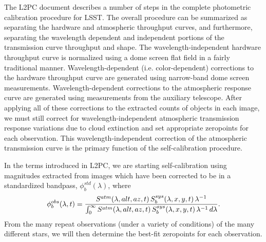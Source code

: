 \documentclass[12pt,preprint]{aastex}
\begin{document}
The L2PC document describes a number of steps in the complete
photometric calibration procedure for LSST. The overall procedure can
be summarized as separating the hardware and atmospheric throughput
curves, and furthermore, separating the wavelength dependent and
independent portions of the transmission curve throughput and
shape. The wavelength-independent hardware throughput curve is
normalized using a dome screen flat field in a fairly traditional
manner. Wavelength-dependent (i.e. color-dependent) corrections to the
hardware throughput curve are generated using narrow-band dome screen
measurements. Wavelength-dependent corrections to the atmospheric
response curve are generated using measurements from the auxiliary
telescope. After applying all of these corrections to the extracted
counts of objects in each image, we must still correct for
wavelength-independent atmospheric transmission response variations
due to cloud extinction and set appropriate zeropoints for each
observation. This wavelength-independent correction of the
atmospheric transmission curve is the primary function of the
self-calibration procedure.


In the terms introduced in L2PC, we are starting self-calibration
using magnitudes extracted from images which have been corrected to be
in a standardized bandpass, $\phi_b^{std}(\lambda)$, where
\begin{equation}
\label{eqn:PhiDef}
	   \phi_b^{obs}(\lambda,t) =  {
	     {S^{atm}(\lambda,alt,az,t)\, S_b^{sys}(\lambda,x,y,t) \,
	       \lambda^{-1}} \over
	     \int_0^\infty { {S^{atm}(\lambda,alt,az,t) \,
	         S_b^{sys}(\lambda,x,y,t) \, \lambda^{-1}} \,d\lambda}}.  
\end{equation}
From the many repeat observations (under a variety of conditions) of the many different stars, we will then determine the best-fit zeropoints for each observation.

\end{document}
